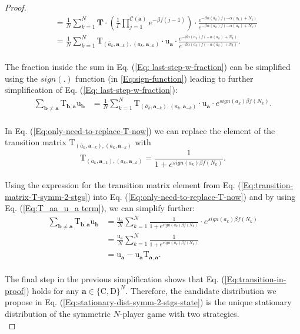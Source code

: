 \documentclass[11pt]{article}
\theoremstyle{plainCl1}
\theoremstyle{plainCl2}
\newcommand{\abf}{\mathbf{a}}
\newcommand{\bbf}{\mathbf{b}}
\newcommand{\T}{\mathbf{T}}
\newcommand{\C}{\mathrm{C}}
\newcommand{\D}{\mathrm{D}}
\begin{document}
\begin{proof}
\begin{align}
&= \frac{1}{N} \sum_{k=1}^N  \T \cdot \left( \frac{1}{\Gamma} \prod_{j=1}^{\mathcal{C}(\abf)} e^{-\beta f(j-1)}\right) \cdot \frac{e^{-\beta \alpha(\bar{a}_k)f(-\alpha(a_k)+ N_k)}}{e^{-\beta \alpha(a_k)f(-\alpha(\bar{a}_k) +N_k)}} \\[10pt]
&= \frac{1}{N} \sum_{k=1}^N  \mathrm{T}_{(\bar{a}_k, \abf_{-k}),(a_k, \abf_{-k})} \cdot \mathrm{u}_\abf \cdot \frac{e^{-\beta \alpha(\bar{a}_k)f(-\alpha(a_k)+ N_k)}}{e^{-\beta \alpha(a_k)f(-\alpha(\bar{a}_k) +N_k)}} . \label{Eq: last-step-w-fraction} 
\end{align}
\\ \noindent The fraction inside the sum in  Eq. (\ref{Eq: last-step-w-fraction}) can be simplified using the $\mathit{sign}(.)$ function (in \ref{Eq:sign-function}) leading to further simplification of Eq. (\ref{Eq: last-step-w-fraction}):
\begin{align}
\sum_{\bbf \neq \abf} \mathrm{T}_{\bbf, \abf} \mathrm{u}_{\bbf} &= \frac{1}{N} \sum_{k=1}^N  \mathrm{T}_{(\bar{a}_k, \abf_{-k}),(a_k, \abf_{-k})} \cdot \mathrm{u}_\abf \cdot e^{sign(a_k) \beta f(N_k)} .
\label{Eq:only-need-to-replace-T-now}
\end{align}
\\ \noindent In Eq. (\ref{Eq:only-need-to-replace-T-now}) we can replace the element of the transition matrix $\mathrm{T}_{(\bar{a}_k, \abf_{-k}),(a_k, \abf_{-k})}$ with
\begin{equation}
\mathrm{T}_{(\bar{a}_k, \abf_{-k}),(a_k, \abf_{-k})} = \frac{1}{1 + \displaystyle e^{\mathit{sign}(a_k) \beta f(N_k)}} .
\label{Eq:transition-matrix-T-symm-2-stgs}
\end{equation}
\\ \noindent Using the expression for the transition matrix element from Eq. (\ref{Eq:transition-matrix-T-symm-2-stgs}) into Eq. (\ref{Eq:only-need-to-replace-T-now}) and by using Eq. (\ref{Eq:T_aa_u_a term}), we can simplify further:
\begin{align}
\sum_{\bbf \neq \abf} \mathrm{T}_{\bbf, \abf} \mathrm{u}_{\bbf} &= \frac{\mathrm{u}_\abf}{N} \sum_{k=1}^N \frac{1}{1 + \displaystyle e^{\mathit{sign}(a_k) \beta f(N_k)}} \cdot  e^{sign(a_k) \beta f(N_k)} \\[10pt]
&= \frac{\mathrm{u}_\abf}{N} \sum_{k=1}^N \frac{1}{1 + \displaystyle e^{\mathit{sign}(\bar{a}_k) \beta f(N_k)}}  \\[10pt]
&= \mathrm{u}_\abf - \mathrm{u}_\abf \mathrm{T}_{\abf,\abf} .
\end{align}
\\ \noindent The final step in the previous simplification shows that Eq. (\ref{Eq:transition-in-proof}) holds for any $\abf \in \{\C,\D\}^N$. Therefore, the candidate distribution we propose in Eq. (\ref{Eq:stationary-dist-symm-2-stgs-state}) is the unique stationary distribution of the symmetric $N$-player game with two strategies. \\
\end{proof}
\end{document}
